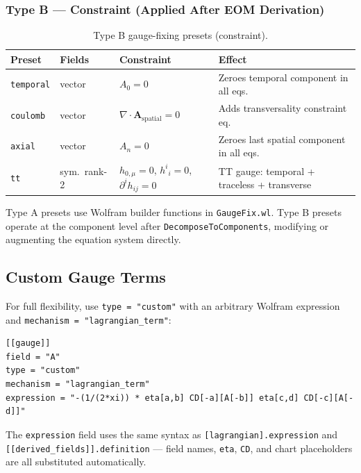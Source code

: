 \subsubsection{Type B --- Constraint (Applied After EOM Derivation)}
\label{sec:gauge-type-b}

\begin{table}[htbp]
\centering
\caption{Type B gauge-fixing presets (constraint).}
\label{tab:gauge-type-b}
\begin{tabular}{@{}llll@{}}
\toprule
Preset & Fields & Constraint & Effect \\
\midrule
\texttt{temporal} & vector & $A_0 = 0$ & Zeroes temporal component in all eqs. \\
\texttt{coulomb} & vector & $\nabla \cdot \mathbf{A}_\text{spatial} = 0$ & Adds transversality constraint eq. \\
\texttt{axial} & vector & $A_n = 0$ & Zeroes last spatial component in all eqs. \\
\texttt{tt} & sym.\ rank-2 & $h_{0,\mu}=0$, $h^i{}_i=0$, $\partial^i h_{ij}=0$ & TT gauge: temporal + traceless + transverse \\
\bottomrule
\end{tabular}
\end{table}

Type A presets use Wolfram builder functions in \texttt{GaugeFix.wl}.
Type B presets operate at the component level after \texttt{DecomposeToComponents},
modifying or augmenting the equation system directly.

\subsection{Custom Gauge Terms}
\label{sec:gauge-custom}

For full flexibility, use \texttt{type = "custom"} with an arbitrary Wolfram
expression and \texttt{mechanism = "lagrangian\_term"}:

\begin{lstlisting}[style=toml]
[[gauge]]
field = "A"
type = "custom"
mechanism = "lagrangian_term"
expression = "-(1/(2*xi)) * eta[a,b] CD[-a][A[-b]] eta[c,d] CD[-c][A[-d]]"
\end{lstlisting}

The \texttt{expression} field uses the same syntax as \texttt{[lagrangian].expression} and
\texttt{[[derived\_fields]].definition} --- field names, \texttt{eta}, \texttt{CD}, and chart
placeholders are all substituted automatically.

